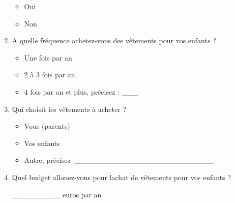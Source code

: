 \documentclass[12pt,twoside]{article}
\begin{document}
\begin{enumerate}
			\begin{itemize}
				\item[\square] Oui
				\item[\square] Non
			\end{itemize}

			\bigskip
			
	\item A quelle fr\'equence achetez{}-vous des v\^etements pour vos
			enfants ?

			\bigskip
			
			\begin{itemize}
				\item[\square] Une fois par an
				\item[\square] 2 \`a 3 fois par an
				\item[\square] 4 fois par an et plus, pr\'ecisez : \_\_\_
			\end{itemize}

			\bigskip
			
	\item Qui choisit les v\^etements \`a acheter ?
	
			\bigskip
			
			\begin{itemize}
				\item[\square] Vous (parents)
				\item[\square] Vos enfants
				\item[\square] Autre, pr\'ecisez :\_\_\_\_\_\_\_\_\_\_\_\_\_\_\_\_\_\_\_\_\_\_\_\_\_\_
			\end{itemize}
	
			\bigskip
			
	\item Quel budget allouez{}-vous pour l{\textquotesingle}achat de v\^etements pour vos enfants ?
		
			\bigskip
			
				\_\_\_\_\_\_\_\_\_ euros par an
				
			\bigskip

	
\end{enumerate}

 
\end{document}
